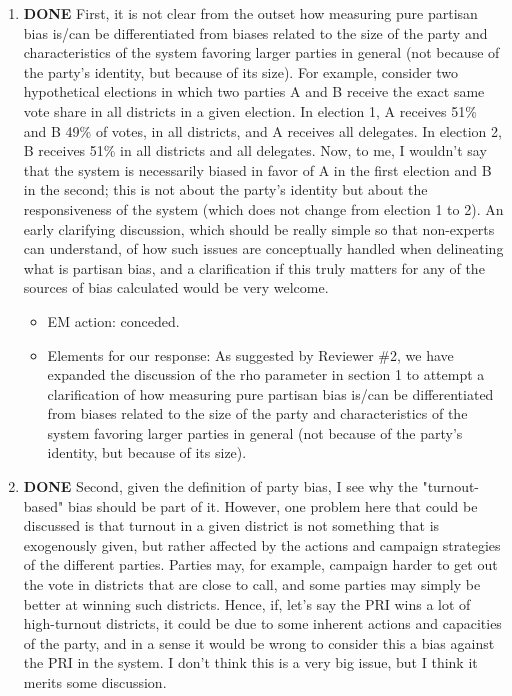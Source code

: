 \documentclass{article}
\begin{document}
\begin{enumerate}
\item {\bfseries\sffamily DONE} First, it is not clear from the outset how measuring pure partisan bias is/can be differentiated from biases related to the size of the party and characteristics of the system favoring larger parties in general (not because of the party's identity, but because of its size). For example, consider two hypothetical elections in which two parties A and B receive the exact same vote share in all districts in a given election. In election 1, A receives 51\% and B 49\% of votes, in all districts, and A receives all delegates. In election 2, B receives 51\% in all districts and all delegates. Now, to me, I wouldn't say that the system is necessarily biased in favor of  A in the first election and B in the second; this is not about the party's identity but about the responsiveness of the system (which does not change from election 1 to 2). An early clarifying discussion, which should be really simple so that non-experts can understand, of how such issues are conceptually handled when delineating what is partisan bias, and a clarification if this truly matters for any of the sources of bias calculated would be very welcome.
\label{sec:orgheadline10}
\begin{itemize}
\item EM action: conceded.
\item Elements for our response: As suggested by Reviewer \#2, we have expanded the discussion of the rho parameter in section 1 to attempt a clarification of how measuring pure partisan bias is/can be differentiated from biases related to the size of the party and characteristics of the system favoring larger parties in general (not because of the party's identity, but because of its size).
\end{itemize}
\item {\bfseries\sffamily DONE} Second, given the definition of party bias, I see why the "turnout-based" bias should be part of it. However, one problem here that could be discussed is that turnout in a given district is not something that is exogenously given, but rather affected by the actions and campaign strategies of the different parties. Parties may, for example, campaign harder to get out the vote in districts that are close to call, and some parties may simply be better at winning such districts. Hence, if, let's say the PRI wins a lot of high-turnout districts, it could be due to some inherent actions and capacities of the party, and in a sense it would be wrong to consider this a bias against the PRI in the system. I don't think this is a very big issue, but I think it merits some discussion.

\end{enumerate}
\end{document}
